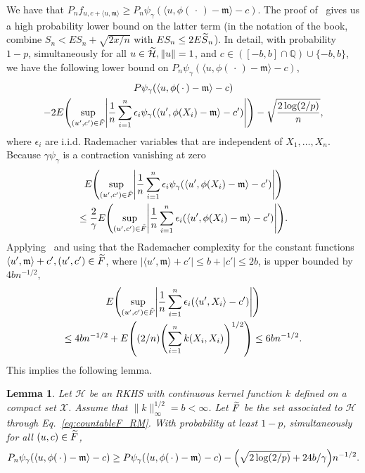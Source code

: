 \documentclass[10pt]{amsart}
\newtheorem{lemm}[theo]{Lemma}\newtheorem{prop}[theo]{Proposition}\newtheorem{coro}[theo]{Corollary}\newtheorem{conj}[theo]{Conjecture}
\theoremstyle{definition}\newtheorem{defi}[theo]{Definition}\newtheorem{rema}[theo]{Remark}\newtheorem{exam}[theo]{Example}\newtheorem{exem}[theo]{Example}\newtheorem{nota}[theo]{Notation}
\theoremstyle{remark}
\newcommand{\bbQ}{\mathbb{Q}}
\newcommand{\X}{\mathcal{X}}
\newcommand{\cH}{\mathcal{H}}
\newcommand{\mean}{\mathfrak{m}}
\newcommand*{\MK}{\mkern 2mu}
\let\oldtilde\tilde
\renewcommand*{\tilde}[1]{\mathchoice{\widetilde{#1}}{\widetilde{#1}}{\oldtilde{#1}}{\oldtilde{#1}}}
\let\originalleft\left
\let\originalright\right
\renewcommand{\left}{\mathopen{}\mathclose\bgroup\originalleft}
\renewcommand{\right}{\aftergroup\egroup\originalright}
\begin{document}
We have that $P_n f_{u,c + \langle u,\mean \rangle} \geq P_n
\psi_\gamma(\langle u, \phi(\,\cdot\,) - \mean \rangle -c)$. The proof of~\cite[Theorem~3.4.5]{GINE15} gives us a high probability lower bound on the latter term (in the notation of the book, combine $S_n < E S_n + \sqrt{2x/n}$ with $ES_n \leq 2 E\tilde S_n$). In detail, with probability $1-p$, simultaneously for all $u \in \tilde \cH, \|u\| = 1$, and $c \in ([-b,b] \cap \bbQ)
\cup \{-b,b\}$, we have the following lower bound on $P_n \psi_\gamma(\langle u, \phi(\,\cdot\,) - \mean \rangle -c)$,
\begin{multline*}
P \psi_\gamma(\langle u, \phi(\,\cdot\,) - \mean \rangle -c)\\
- 2 E\left(\sup_{(u',c') \in \tilde{F}} \left| \frac{1}{n} \sum_{i=1}^n \epsilon_i \psi_\gamma(\langle u', \phi(X_i) - \mean \rangle -c') \right|\right) - \sqrt{\frac{2 \log(2/p)}{n}},
\end{multline*}
where $\epsilon_i$ are i.i.d. Rademacher variables that are independent of $X_1,\dots, X_n$. Because $\gamma \psi_\gamma$ is a contraction vanishing at zero
\begin{multline*}
E\left(\sup_{(u',c') \in \tilde F} \left| \frac{1}{n} \sum_{i=1}^n \epsilon_i \psi_\gamma(\langle u', \phi(X_i) - \mean \rangle -c') \right|\right)\\
\leq \frac{2}{\gamma} E\left(\sup_{(u',c') \in \tilde{F}} \left| \frac{1}{n} \sum_{i=1}^n \epsilon_i (\langle u', \phi(X_i) - \mean \rangle -c') \right|\right).
\end{multline*}
Applying~\cite[Theorem~12$\MK$(7) and Lemma~22]{BART02} and using that the Rademacher complexity for the constant functions $\langle u', \mean \rangle + c', (u',c') \in \tilde F$, where $|\langle u', \mean\rangle + c'| \leq b + |c'| \leq 2 b$, is upper bounded by $4b n^{-1/2}$,
\begin{multline*}
E\left(\sup_{(u',c') \in \tilde F} \left| \frac{1}{n} \sum_{i=1}^n \epsilon_i (\langle u', X_i \rangle -c') \right|\right)\\ \leq 4b n^{-1/2} + E\left((2/n)\left(\sum_{i=1}^n k(X_i, X_i)\right)^{1/2} \right) \leq 6 bn^{-1/2}.
\end{multline*}
This implies the following lemma.

\begin{lemm}\label{lem:conc_RM}
Let $\cH$ be an RKHS with continuous kernel function $k$ defined on a compact set $\X$. Assume that $\|k\|_\infty^{1/2} = b < \infty$. Let $\tilde{F}$ be the set associated to $\cH$ through Eq.~\eqref{eq:countableF_RM}. With probability at least $1-p$, simultaneously for all $(u,c) \in \tilde F$,
\[
P_n \psi_\gamma(\langle u, \phi(\,\cdot\,) - \mean \rangle -c) \geq P \psi_\gamma(\langle u, \phi(\,\cdot\,) - \mean \rangle -c) - \left(\sqrt{2\log(2/p)} + 24b/\gamma\right) n^{-1/2}.
\]
\end{lemm}
\end{document}
